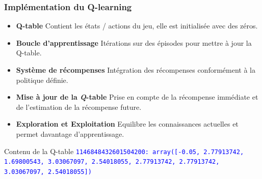 \documentclass[
	11pt, %
]{beamer}
\begin{document}
\begin{frame}
	\frametitle{Implémentation du Q-learning}

	\begin{itemize}
        \item \textbf{Q-table} Contient les états / actions du jeu, elle est initialisée avec des zéros.
        \item \textbf{Boucle d'apprentissage} Itérations sur des épisodes pour mettre à jour la Q-table.
        \item \textbf{Système de récompenses} Intégration des récompenses conformément à la politique définie.
        \item \textbf{Mise à jour de la \textbf \textit Q-table} Prise en compte de la récompense immédiate et de l'estimation de la récompense future.
        \item \textbf{Exploration et Exploitation} Equilibre les connaissances actuelles et permet davantage d'apprentissage.
    \end{itemize}

    \begin{block}{Contenu de la Q-table}
        \textcolor{blue}{\texttt{1146848432601504200: array([-0.05, 2.77913742, 1.69800543, 3.03067097, 2.54018055, 2.77913742, 2.77913742, 3.03067097, 2.54018055])}}
    \end{block}

\end{frame}
\end{document}
